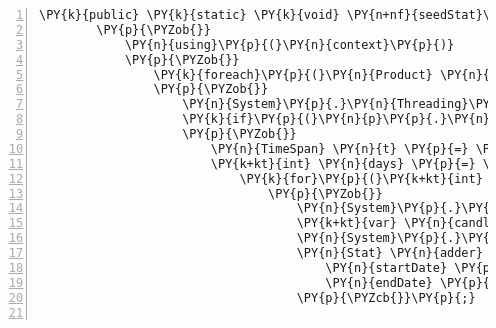 \begin{Verbatim}[commandchars=\\\{\},numbers=left,firstnumber=1,stepnumber=1,numberblanklines=0]
        \PY{k}{public} \PY{k}{static} \PY{k}{void} \PY{n+nf}{seedStat}\PY{p}{(}\PY{k+kt}{int} \PY{n}{exchangeID}\PY{p}{,} \PY{n}{DateTime} \PY{n}{startDate}\PY{p}{,} \PY{n}{DateTime} \PY{n}{endDate}\PY{p}{,} \PY{n}{CryptoContext} \PY{n}{context}\PY{p}{)}
        \PY{p}{\PYZob{}}
            \PY{n}{using}\PY{p}{(}\PY{n}{context}\PY{p}{)}
            \PY{p}{\PYZob{}}
                \PY{k}{foreach}\PY{p}{(}\PY{n}{Product} \PY{n}{p} \PY{k}{in} \PY{n}{client}\PY{p}{.}\PY{n}{ProductsService}\PY{p}{.}\PY{n}{GetAllProductsAsync}\PY{p}{(}\PY{p}{)}\PY{p}{.}\PY{n}{Result}\PY{p}{)}
                \PY{p}{\PYZob{}}
                    \PY{n}{System}\PY{p}{.}\PY{n}{Threading}\PY{p}{.}\PY{n}{Thread}\PY{p}{.}\PY{n}{Sleep}\PY{p}{(}\PY{l+m}{3}\PY{l+m}{0}\PY{l+m}{0}\PY{l+m}{0}\PY{p}{)}\PY{p}{;}
                    \PY{k}{if}\PY{p}{(}\PY{n}{p}\PY{p}{.}\PY{n}{Id}\PY{p}{.}\PY{n}{ToString}\PY{p}{(}\PY{p}{)}\PY{p}{.}\PY{n}{Equals}\PY{p}{(}\PY{n}{context}\PY{p}{.}\PY{n}{Exchanges}\PY{p}{.}\PY{n}{Find}\PY{p}{(}\PY{n}{exchangeID}\PY{p}{)}\PY{p}{.}\PY{n}{Name}\PY{p}{)}\PY{p}{)}
                    \PY{p}{\PYZob{}}
                        \PY{n}{TimeSpan} \PY{n}{t} \PY{p}{=} \PY{n}{endDate}\PY{p}{.}\PY{n}{Subtract}\PY{p}{(}\PY{n}{startDate}\PY{p}{)}\PY{p}{;}
                        \PY{k+kt}{int} \PY{n}{days} \PY{p}{=} \PY{p}{(}\PY{k+kt}{int}\PY{p}{)}\PY{n}{t}\PY{p}{.}\PY{n}{TotalDays}\PY{p}{;}
                            \PY{k}{for}\PY{p}{(}\PY{k+kt}{int} \PY{n}{i} \PY{p}{=} \PY{l+m}{0}\PY{p}{;} \PY{n}{i} \PY{p}{\PYZlt{}} \PY{n}{days}\PY{p}{;} \PY{n}{i}\PY{p}{+}\PY{p}{+}\PY{p}{)}
                                \PY{p}{\PYZob{}}
                                    \PY{n}{System}\PY{p}{.}\PY{n}{Threading}\PY{p}{.}\PY{n}{Thread}\PY{p}{.}\PY{n}{Sleep}\PY{p}{(}\PY{l+m}{3}\PY{l+m}{0}\PY{l+m}{0}\PY{l+m}{0}\PY{p}{)}\PY{p}{;}
                                    \PY{k+kt}{var} \PY{n}{candles} \PY{p}{=} \PY{n}{client}\PY{p}{.}\PY{n}{ProductsService}\PY{p}{.}\PY{n}{GetHistoricRatesAsync}\PY{p}{(}\PY{n}{p}\PY{p}{.}\PY{n}{Id}\PY{p}{,} \PY{n}{startDate}\PY{p}{,} \PY{n}{endDate}\PY{p}{,} \PY{n}{CandleGranularity}\PY{p}{.}\PY{n}{Minutes1}\PY{p}{)}\PY{p}{.}\PY{n}{Result}\PY{p}{;}
                                    \PY{n}{System}\PY{p}{.}\PY{n}{Threading}\PY{p}{.}\PY{n}{Thread}\PY{p}{.}\PY{n}{Sleep}\PY{p}{(}\PY{l+m}{1}\PY{l+m}{0}\PY{l+m}{0}\PY{l+m}{0}\PY{p}{)}\PY{p}{;}
                                    \PY{n}{Stat} \PY{n}{adder} \PY{p}{=} \PY{k}{new} \PY{n}{Stat}\PY{p}{(}\PY{p}{)}\PY{p}{\PYZob{}}
                                        \PY{n}{startDate} \PY{p}{=} \PY{n}{candles}\PY{p}{.}\PY{n}{First}\PY{p}{(}\PY{p}{)}\PY{p}{.}\PY{n}{Time}\PY{p}{,}
                                        \PY{n}{endDate} \PY{p}{=} \PY{n}{candles}\PY{p}{.}\PY{n}{Last}\PY{p}{(}\PY{p}{)}\PY{p}{.}\PY{n}{Time}  
                                    \PY{p}{\PYZcb{}}\PY{p}{;}


\end{Verbatim}
